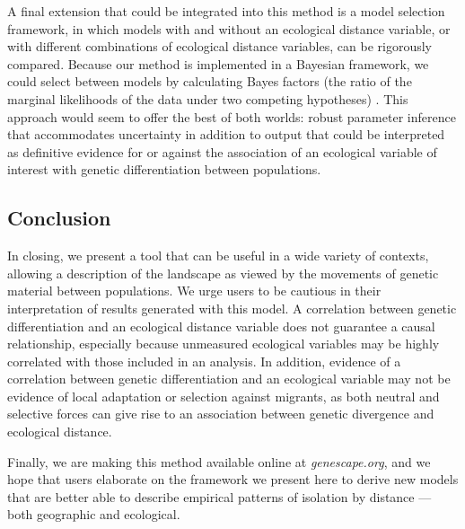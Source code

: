 A final extension that could be integrated into this method is a model selection framework, in which models with and without an ecological distance variable, or with different combinations of ecological distance variables, can be rigorously compared. 
Because our method is implemented in a Bayesian framework, we could select between models by calculating Bayes factors (the ratio of the marginal likelihoods of the data under two competing hypotheses) \citep{Dickey1971, VerdinelliWasserman1995}.  
This approach would seem to offer the best of both worlds: robust parameter inference that accommodates uncertainty in addition to output that could be interpreted as definitive evidence for or against the association of an ecological variable of interest with genetic differentiation between populations.  

\subsection*{Conclusion}

In closing, we present a tool that can be useful in a wide variety of contexts,
allowing a description of the landscape as viewed by the movements of genetic material between populations.
We urge users to be cautious in their interpretation of results generated with this model.  A correlation between genetic differentiation and an ecological distance variable does not guarantee a causal relationship, especially because unmeasured ecological variables may be highly correlated with those included in an analysis.  In addition, evidence of a correlation between genetic differentiation and an ecological variable may not be evidence of local adaptation or selection against migrants, as both neutral and selective forces can give rise to an association between genetic divergence and ecological distance.  

Finally, we are making this method available online at \textit{genescape.org}, and we hope that users elaborate on the framework we present here to derive new models that are better able to describe empirical patterns of isolation by distance --- both geographic and ecological.  



